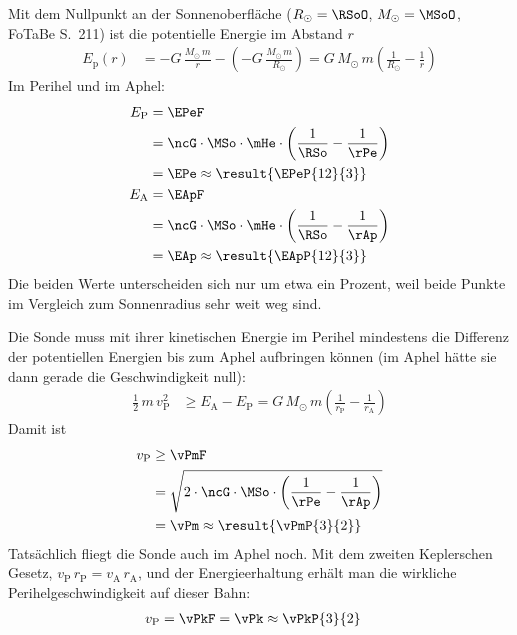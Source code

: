 \begin{center}
\end{center}

\begin{abcliste}
\abc Mit dem Nullpunkt an der Sonnenoberfläche ($R_\odot = \RSoO$, $M_\odot = \MSoO$, FoTaBe S.~211) ist die potentielle Energie im Abstand $r$
\begin{align}
 E_\mathrm{p}(r) &= -G\,\frac{M_\odot\,m}{r}-\left(-G\,\frac{M_\odot\,m}{R_\odot}\right) = G\,M_\odot\,m\left(\frac{1}{R_\odot}-\frac{1}{r}\right)
\end{align}
Im Perihel und im Aphel:
\begin{align}
 E_\mathrm{P} &= \EPeF \\
   &= \ncG\cdot\MSo\cdot\mHe\cdot\left(\frac{1}{\RSo}-\frac{1}{\rPe}\right) \\
   &= \EPe \approx \result{\EPeP{12}{3}} \\
 E_\mathrm{A} &= \EApF \\
   &= \ncG\cdot\MSo\cdot\mHe\cdot\left(\frac{1}{\RSo}-\frac{1}{\rAp}\right) \\
   &= \EAp \approx \result{\EApP{12}{3}}
\end{align}
Die beiden Werte unterscheiden sich nur um etwa ein Prozent, weil beide Punkte im Vergleich zum Sonnenradius sehr weit weg sind.

\abc Die Sonde muss mit ihrer kinetischen Energie im Perihel mindestens die Differenz der potentiellen Energien bis zum Aphel aufbringen können (im Aphel hätte sie dann gerade die Geschwindigkeit null):
\begin{align}
 \frac{1}{2}\,m\,v_\mathrm{P}^2 &\geq E_\mathrm{A}-E_\mathrm{P} = G\,M_\odot\,m\left(\frac{1}{r_\mathrm{P}}-\frac{1}{r_\mathrm{A}}\right)
\end{align}
Damit ist
\begin{align}
 v_\mathrm{P} &\geq \vPmF \\
   &= \sqrt{2\cdot\ncG\cdot\MSo\cdot\left(\frac{1}{\rPe}-\frac{1}{\rAp}\right)} \\
   &= \vPm \approx \result{\vPmP{3}{2}}
\end{align}
Tatsächlich fliegt die Sonde auch im Aphel noch. Mit dem zweiten Keplerschen Gesetz, $v_\mathrm{P}\,r_\mathrm{P} = v_\mathrm{A}\,r_\mathrm{A}$, und der Energieerhaltung erhält man die wirkliche Perihelgeschwindigkeit auf dieser Bahn:
\begin{align}
 v_\mathrm{P} &= \vPkF = \vPk \approx \vPkP{3}{2}
\end{align}
\end{abcliste}
